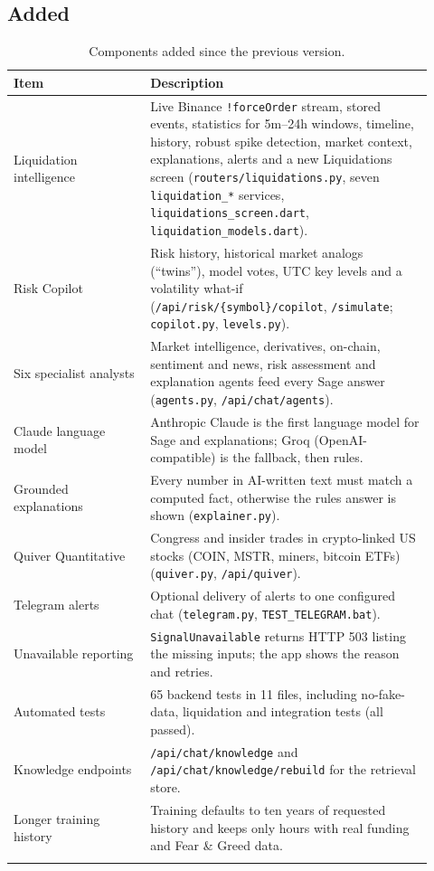 \subsection{Added}
{\renewcommand{\arraystretch}{1.3}
\begin{longtable}{|p{0.30\linewidth}|p{0.62\linewidth}|}
\hline\textbf{Item} & \textbf{Description}\\\hline\endhead
Liquidation intelligence & Live Binance \texttt{!forceOrder} stream, stored events, statistics for 5m--24h windows, timeline, history, robust spike detection, market context, explanations, alerts and a new Liquidations screen (\texttt{routers/liquidations.py}, seven \texttt{liquidation\_*} services, \texttt{liquidations\_screen.dart}, \texttt{liquidation\_models.dart}).\\\hline
Risk Copilot & Risk history, historical market analogs (``twins''), model votes, UTC key levels and a volatility what-if (\texttt{/api/risk/\{symbol\}/copilot}, \texttt{/simulate}; \texttt{copilot.py}, \texttt{levels.py}).\\\hline
Six specialist analysts & Market intelligence, derivatives, on-chain, sentiment and news, risk assessment and explanation agents feed every Sage answer (\texttt{agents.py}, \texttt{/api/chat/agents}).\\\hline
Claude language model & Anthropic Claude is the first language model for Sage and explanations; Groq (OpenAI-compatible) is the fallback, then rules.\\\hline
Grounded explanations & Every number in AI-written text must match a computed fact, otherwise the rules answer is shown (\texttt{explainer.py}).\\\hline
Quiver Quantitative & Congress and insider trades in crypto-linked US stocks (COIN, MSTR, miners, bitcoin ETFs) (\texttt{quiver.py}, \texttt{/api/quiver}).\\\hline
Telegram alerts & Optional delivery of alerts to one configured chat (\texttt{telegram.py}, \texttt{TEST\_TELEGRAM.bat}).\\\hline
Unavailable reporting & \texttt{SignalUnavailable} returns HTTP 503 listing the missing inputs; the app shows the reason and retries.\\\hline
Automated tests & 65 backend tests in 11 files, including no-fake-data, liquidation and integration tests (all passed).\\\hline
Knowledge endpoints & \texttt{/api/chat/knowledge} and \texttt{/api/chat/knowledge/rebuild} for the retrieval store.\\\hline
Longer training history & Training defaults to ten years of requested history and keeps only hours with real funding and Fear \& Greed data.\\\hline
\caption{Components added since the previous version.}\label{tab:added}
\end{longtable}}


